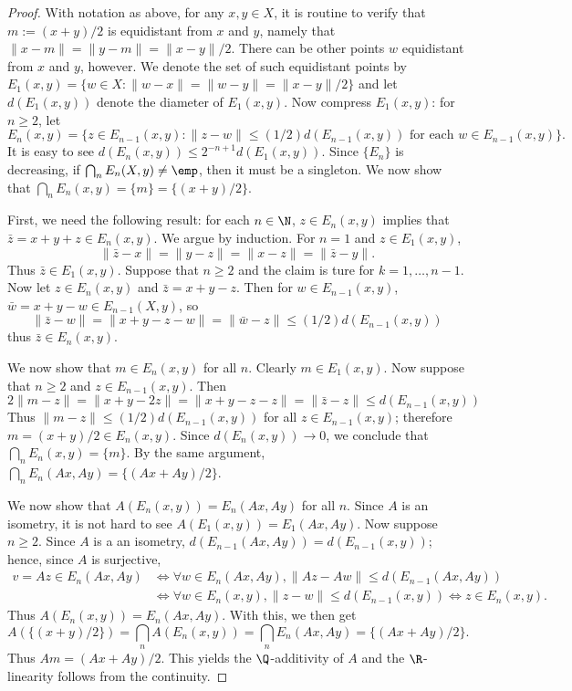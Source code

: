 \begin{proof}
With notation as above, for any $x,y\in X$, it is routine to verify that $m:=(x+y)/2$ is equidistant from $x$ and $y$, namely that $\|x-m\|=\|y-m\|=\|x-y\|/2$. There can be other points $w$ equidistant from $x$ and $y$, however. We denote the set of such equidistant points by $E_1(x,y)=\{w\in X:\|w-x\|=\|w-y\|=\|x-y\|/2\}$ and let $d(E_1(x,y))$ denote the diameter of $E_1(x,y)$. Now compress $E_1(x,y)$: for $n\geq 2$, let
\[E_n(x,y)=\{z\in E_{n-1}(x,y):\|z-w\|\leq (1/2)d(E_{n-1}(x,y))\text{ for each $w\in E_{n-1}(x,y)$}\}.\]
It is easy to see $d(E_n(x,y))\leq 2^{-n+1}d(E_1(x,y))$. Since $\{E_n\}$ is decreasing, if $\bigcap_nE_n(X,y)\neq\emp$, then it must be a singleton. We now show that $\bigcap_nE_n(x,y)=\{m\}=\{(x+y)/2\}$.\par
First, we need the following result: for each $n\in\N$, $z\in E_n(x,y)$ implies that $\bar{z}=x+y+z\in E_n(x,y)$. We argue by induction. For $n=1$ and $z\in E_1(x,y)$,
\[\|\bar{z}-x\|=\|y-z\|=\|x-z\|=\|\bar{z}-y\|.\]
Thus $\bar{z}\in E_1(x,y)$. Suppose that $n\geq 2$ and the claim is ture for $k=1,\dots,n-1$. Now let $z\in E_n(x,y)$ and $\bar{z}=x+y-z$. Then for $w\in E_{n-1}(x,y)$, $\bar{w}=x+y-w\in E_{n-1}(X,y)$, so
\[\|\bar{z}-w\|=\|x+y-z-w\|=\|\bar{w}-z\|\leq(1/2)d(E_{n-1}(x,y))\]
thus $\bar{z}\in E_n(x,y)$.\par
We now show that $m\in E_n(x,y)$ for all $n$. Clearly $m\in E_1(x,y)$. Now suppose that $n\geq 2$ and $z\in E_{n-1}(x,y)$. Then
\[2\|m-z\|=\|x+y-2z\|=\|x+y-z-z\|=\|\bar{z}-z\|\leq d(E_{n-1}(x,y))\]
Thus $\|m-z\|\leq (1/2)d(E_{n-1}(x,y))$ for all $z\in E_{n-1}(x,y)$; therefore $m=(x+y)/2\in E_n(x,y)$. Since $d(E_n(x,y))\to 0$, we conclude that $\bigcap_nE_n(x,y)=\{m\}$. By the same argument, $\bigcap_nE_n(Ax,Ay)=\{(Ax+Ay)/2\}$.\par
We now show that $A(E_n(x,y))=E_n(Ax,Ay)$ for all $n$. Since $A$ is an isometry, it is not hard to see $A(E_1(x,y))=E_1(Ax,Ay)$. Now suppose $n\geq 2$. Since $A$ is a an isometry, $d(E_{n-1}(Ax,Ay))=d(E_{n-1}(x,y))$; hence, since $A$ is surjective,
\begin{align*}
v=Az\in E_n(Ax,Ay)&\iff\forall w\in E_n(Ax,Ay),\|Az-Aw\|\leq d(E_{n-1}(Ax,Ay))\\
&\iff\forall w\in E_n(x,y),\|z-w\|\leq d(E_{n-1}(x,y))\iff z\in E_n(x,y).
\end{align*}
Thus $A(E_n(x,y))=E_n(Ax,Ay)$. With this, we then get
\[A(\{(x+y)/2\})=\bigcap_{n}A(E_n(x,y))=\bigcap_nE_n(Ax,Ay)=\{(Ax+Ay)/2\}.\]
Thus $Am=(Ax+Ay)/2$. This yields the $\Q$-additivity of $A$ and the $\R$-linearity follows from the continuity.
\end{proof}
